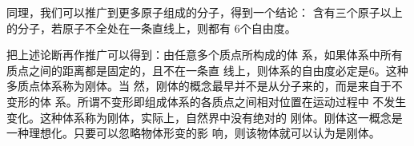 同理，我们可以推广到更多原子组成的分子，得到一个结论：
含有三个原子以上的分子，若原子不全处在一条直线上，则都有
$ 6 $个自由度。

把上述论断再作推广可以得到：由任意多个质点所构成的体
系，如果体系中所有质点之间的距离都是固定的，且不在一条直
线上，则体系的自由度必定是$ 6 $。这种多质点体系称为刚体。当
然，刚体的概念最早并不是从分子来的，而是来自于不变形的体
系。所谓不变形即组成体系的各质点之间相对位置在运动过程中
不发生变化。这种体系称为刚体，实际上，自然界中没有绝对的
刚体。刚体这一概念是一种理想化。只要可以忽略物体形变的影
响，则该物体就可以认为是刚体。
